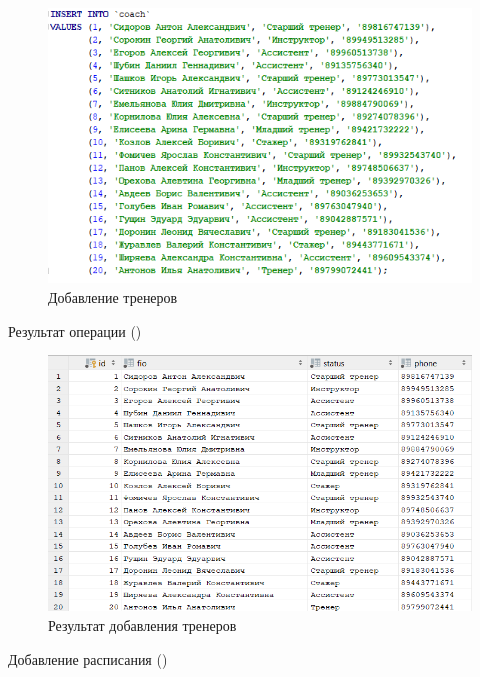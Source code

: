 \documentclass[a4paper,14pt]{article}
\begin{document}
	\begin{figure}[H]
		\centering		
		\includegraphics[width=\linewidth]{image/insertCoach}
		\caption{Добавление тренеров}\label{img:insertCoach}
	\end{figure} 
	
	Результат операции ()
	
	\begin{figure}[H]
		\centering		
		\includegraphics[width=\linewidth]{image/selectCoach}
		\caption{Результат добавления тренеров }\label{img:selectCoach}
	\end{figure} 

	Добавление расписания ()
\end{document}
